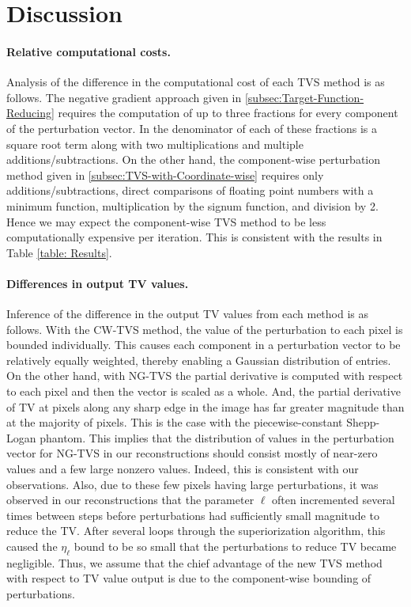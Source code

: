 \documentclass[smallextended]{svjour3}      %
\begin{document}
\section{Discussion} \label{sec: Discussion}

\paragraph{\textbf {Relative computational costs}.}

Analysis of the difference in the computational cost of each TVS method is as follows. The negative gradient approach given in \ref{subsec:Target-Function-Reducing} requires the computation of up to three fractions for every component of the perturbation vector. In the denominator of each of these fractions is a square root term along with two multiplications and multiple additions/subtractions. On the other hand, the component-wise perturbation  method given in \ref{subsec:TVS-with-Coordinate-wise} requires only additions/subtractions, direct comparisons of floating point numbers with a minimum function, multiplication by the signum function, and division by 2. Hence we may expect the component-wise TVS method to be less computationally expensive per iteration. This is consistent with the results in Table \ref{table: Results}.

\paragraph{\textbf {Differences in output TV values}.}

	Inference of the difference in the output TV values from each method is as follows. With the CW-TVS method, the value of the perturbation to each pixel is bounded individually. This causes each component in a perturbation vector to be relatively equally weighted, thereby enabling a Gaussian distribution of entries. On the other hand, with NG-TVS the partial derivative is computed with respect to each pixel and then the vector is scaled as a whole. And, the partial derivative of TV at pixels along any sharp edge in the image has far greater magnitude than at the majority of pixels. This is the case with the piecewise-constant Shepp-Logan phantom. This implies that the distribution of values in the perturbation vector for NG-TVS in our reconstructions should consist mostly of near-zero values and a few  large nonzero values. Indeed, this is consistent with our observations. Also, due to these few pixels having large perturbations, it was observed in our reconstructions that the parameter $\ell$ often incremented several times between steps before perturbations had sufficiently small magnitude to reduce the TV. After several loops through the superiorization algorithm, this caused the $\eta_{\ell}$ bound to be so small that the perturbations to reduce TV became negligible. Thus, we assume that the chief advantage of the new TVS method with respect to TV value output is due to the component-wise bounding of perturbations.
\end{document}
